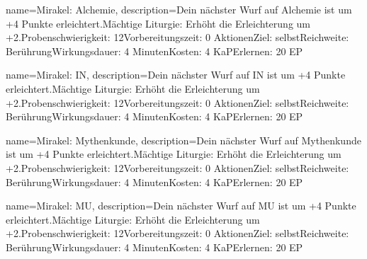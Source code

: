 {
    name={Mirakel: Alchemie},
    description={Dein nächster Wurf auf Alchemie ist um +4 Punkte erleichtert.\newline Mächtige Liturgie: Erhöht die Erleichterung um +2.\newline Probenschwierigkeit: 12\newline Vorbereitungszeit: 0 Aktionen\newline Ziel: selbst\newline Reichweite: Berührung\newline Wirkungsdauer: 4 Minuten\newline Kosten: 4 KaP\newline Erlernen: 20 EP}
}


{
    name={Mirakel: IN},
    description={Dein nächster Wurf auf IN ist um +4 Punkte erleichtert.\newline Mächtige Liturgie: Erhöht die Erleichterung um +2.\newline Probenschwierigkeit: 12\newline Vorbereitungszeit: 0 Aktionen\newline Ziel: selbst\newline Reichweite: Berührung\newline Wirkungsdauer: 4 Minuten\newline Kosten: 4 KaP\newline Erlernen: 20 EP}
}


{
    name={Mirakel: Mythenkunde},
    description={Dein nächster Wurf auf Mythenkunde ist um +4 Punkte erleichtert.\newline Mächtige Liturgie: Erhöht die Erleichterung um +2.\newline Probenschwierigkeit: 12\newline Vorbereitungszeit: 0 Aktionen\newline Ziel: selbst\newline Reichweite: Berührung\newline Wirkungsdauer: 4 Minuten\newline Kosten: 4 KaP\newline Erlernen: 20 EP}
}


{
    name={Mirakel: MU},
    description={Dein nächster Wurf auf MU ist um +4 Punkte erleichtert.\newline Mächtige Liturgie: Erhöht die Erleichterung um +2.\newline Probenschwierigkeit: 12\newline Vorbereitungszeit: 0 Aktionen\newline Ziel: selbst\newline Reichweite: Berührung\newline Wirkungsdauer: 4 Minuten\newline Kosten: 4 KaP\newline Erlernen: 20 EP}
}


